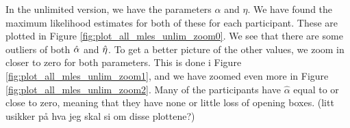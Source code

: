 In the unlimited version, we have the parameters $\alpha$ and $\eta$. We have found the maximum likelihood estimates for both of these for each participant. These are plotted in Figure \ref{fig:plot_all_mles_unlim_zoom0}. We see that there are some outliers of both $\hat{\alpha}$ and $\hat{\eta}$. To get a better picture of the other values, we zoom in closer to zero for both parameters. This is done i Figure \ref{fig:plot_all_mles_unlim_zoom1}, and we have zoomed even more in Figure \ref{fig:plot_all_mles_unlim_zoom2}. Many of the participants have $\hat{\alpha}$ equal to or close to zero, meaning that they have none or little loss of opening boxes. 
(litt usikker på hva jeg skal si om disse plottene?)


